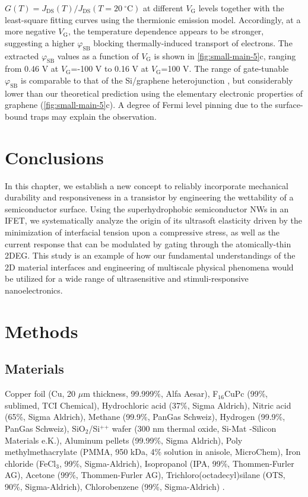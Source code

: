 \(G(T)=J_{\mathrm{DS}}(T)/J_{\mathrm{DS}}(T=20\ ^{\circ} \mathrm{C})\)
at different \(V_{\mathrm{G}}\) levels together with the least-square
fitting curves using the thermionic emission model. Accordingly, at a
more negative \(V_{\mathrm{G}}\), the temperature dependence appears
to be stronger, suggesting a higher \(\varphi_{\mathrm{SB}}\) blocking
thermally-induced transport of electrons. The extracted
\(\varphi_{\mathrm{SB}}\) values as a function of \(V_{\mathrm{G}}\)
is shown in \autoref{fig:small-main-5}c, ranging from 0.46 V at
\(V_{\mathrm{G}}\)=-100 V to 0.16 V at \(V_{\mathrm{G}}\)=100 V.  The
range of gate-tunable \(\varphi_{\mathrm{SB}}\) is comparable to that
of the Si/graphene heterojunction \autocite{Yang_2012_Barristor}, but
considerably lower than our theoretical prediction using the
elementary electronic properties of graphene (\autoref{fig:small-main-5}c). A degree of Fermi level pinning due to
the surface-bound traps \autocite{Meric_2008_saturation_gr_FET} may
explain the observation.

\section{Conclusions}
\label{sec:small-conclusions}

In this chapter, we establish a new concept to reliably incorporate
mechanical durability and responsiveness in a transistor by
engineering the wettability of a semiconductor surface. Using the
superhydrophobic semiconductor NWs in an IFET, we systematically
analyze the origin of its ultrasoft elasticity driven by the
minimization of interfacial tension upon a compressive stress, as well
as the current response that can be modulated by gating through the
atomically-thin 2DEG.
%
This study is an example of how our fundamental understandings of the
2D material interfaces and engineering of multiscale physical
phenomena would be utilized for a wide range of ultrasensitive and
stimuli-responsive nano\-electronics.




\section{Methods}
\label{sec:small-method}

\subsection*{Materials}
\label{sec:small-org2cee247}
Copper foil (Cu, 20 \(\mu \mathrm{m}\) thickness, 99.999\%, Alfa Aesar),
F\(_{\text{16}}\)CuPc (99\%, sublimed, TCI Chemical), Hydrochloric acid (37\%,
Sigma Aldrich), Nitric acid (65\%, Sigma Aldrich), Methane (99.9\%,
PanGas Schweiz), Hydrogen (99.9\%, PanGas Schweiz), SiO\(_{\text{2}}\)/Si\(^{\text{++}}\)
wafer (300 nm thermal oxide, Si-Mat -Silicon Materials e.K.), Aluminum
pellets (99.99\%, Sigma Aldrich), Poly methylmethacrylate (PMMA, 950
kDa, 4\% solution in anisole, MicroChem), Iron chloride (FeCl\(_{\text{3}}\), 99\%,
Sigma-Aldrich), Isopropanol (IPA, 99\%, Thommen-Furler AG), Acetone
(99\%, Thommen-Furler AG), Trichloro(octadecyl)silane (OTS, 90\%,
Sigma-Aldrich), Chlorobenzene (99\%, Sigma-Aldrich) .

